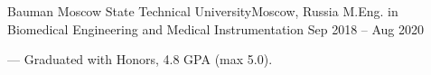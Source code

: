 \resumeSubheading
{Bauman Moscow State Technical University}{Moscow, Russia}
{M.Eng. in Biomedical Engineering and Medical Instrumentation }{Sep 2018 -- Aug 2020}
\begin{itemize}[leftmargin=0in, label={}]
    \small{\item{
        {— Graduated with Honors, 4.8 GPA (max 5.0).}\\
    }}
    \end{itemize}
